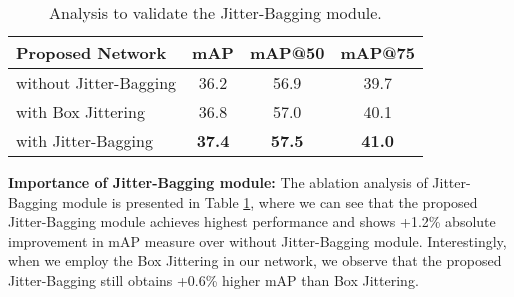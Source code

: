 \documentclass[10pt,twocolumn,letterpaper]{article}
\begin{document}
\begin{table}[t!]
\centering
\caption{
Analysis to validate the Jitter-Bagging module.} \label{Tab:JitterBagging}\vspace{-0.5em}
\begin{adjustbox}{width=.8\linewidth,center}
\begin{tabular}{l|ccc}
\hline
\multicolumn{1}{l|}{\textbf{Proposed Network}} & \textbf{mAP}  & \textbf{mAP@50} & \textbf{mAP@75} \\ \hline
without Jitter-Bagging & 36.2 & 56.9   & 39.7   \\
with Box Jittering \cite{xu2021end} & 36.8 & 57.0 & 40.1   \\
with Jitter-Bagging  & \textbf{37.4} & \textbf{57.5}   & \textbf{41.0}  \\ \hline
\end{tabular}
\end{adjustbox}
\end{table}
\textbf{Importance of Jitter-Bagging module:} The ablation analysis of Jitter-Bagging module is presented in Table \ref{Tab:JitterBagging}, where we can see that the proposed Jitter-Bagging module achieves highest performance and shows +1.2\% absolute improvement in mAP measure over without Jitter-Bagging module. Interestingly, when we employ the Box Jittering \cite{xu2021end} in our network, we observe that the proposed Jitter-Bagging still obtains +0.6\% higher mAP than Box Jittering.
\end{document}
